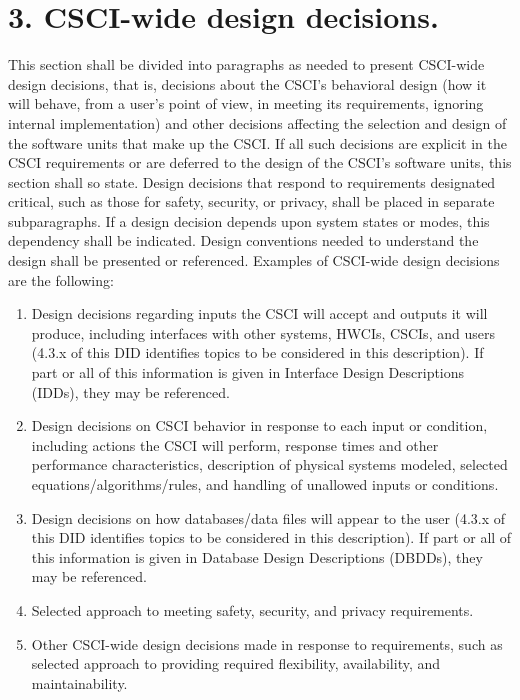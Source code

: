 \section{3. CSCI-wide design decisions.}

This section shall be divided into paragraphs as needed to present
CSCI-wide design decisions, that is, decisions about the CSCI's
behavioral design (how it will behave, from a user's point of view, in
meeting its requirements, ignoring internal implementation) and other
decisions affecting the selection and design of the software units that
make up the CSCI. If all such decisions are explicit in the CSCI
requirements or are deferred to the design of the CSCI's software units,
this section shall so state. Design decisions that respond to
requirements designated critical, such as those for safety, security, or
privacy, shall be placed in separate subparagraphs. If a design decision
depends upon system states or modes, this dependency shall be indicated.
Design conventions needed to understand the design shall be presented or
referenced. Examples of CSCI-wide design decisions are the following:

\begin{enumerate}
\itemsep1pt\parskip0pt
\item
  Design decisions regarding inputs the CSCI will accept and outputs it
  will produce, including interfaces with other systems, HWCIs, CSCIs,
  and users (4.3.x of this DID identifies topics to be considered in
  this description). If part or all of this information is given in
  Interface Design Descriptions (IDDs), they may be referenced.
\item
  Design decisions on CSCI behavior in response to each input or
  condition, including actions the CSCI will perform, response times and
  other performance characteristics, description of physical systems
  modeled, selected equations/algorithms/rules, and handling of
  unallowed inputs or conditions.
\item
  Design decisions on how databases/data files will appear to the user
  (4.3.x of this DID identifies topics to be considered in this
  description). If part or all of this information is given in Database
  Design Descriptions (DBDDs), they may be referenced.
\item
  Selected approach to meeting safety, security, and privacy
  requirements.
\item
  Other CSCI-wide design decisions made in response to requirements,
  such as selected approach to providing required flexibility,
  availability, and maintainability.
\end{enumerate}

